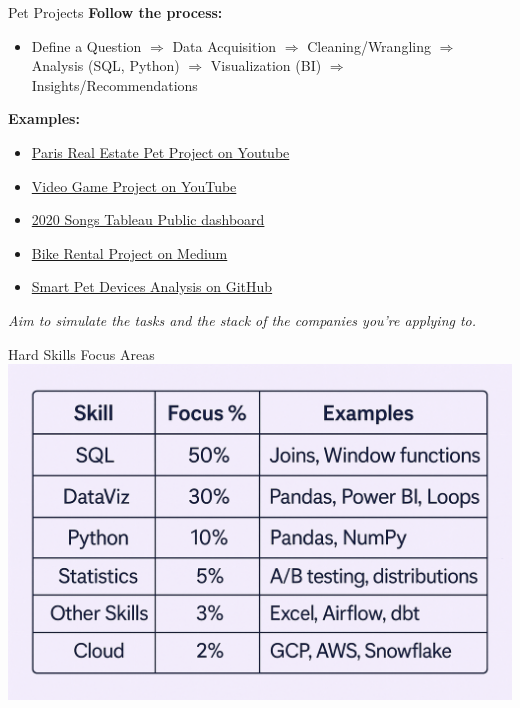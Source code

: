 \documentclass[10pt,a4paper]{article}
\begin{document}
\begin{multicols}{3}
\begin{textbox}{Pet Projects}
\textbf{Follow the process:}
\begin{itemize}
    \item Define a Question $\Rightarrow$ Data Acquisition $\Rightarrow$ Cleaning/Wrangling $\Rightarrow$ Analysis (SQL, Python) $\Rightarrow$ Visualization (BI) $\Rightarrow$ Insights/Recommendations
\end{itemize}
\textbf{Examples:}
\begin{itemize}
    \item \href{https://youtube.com/watch?v=HKuhMtrEgDE}{Paris Real Estate Pet Project on Youtube}
    \item \href{https://youtube.com/watch?v=HKuhMtrEgDE}{Video Game Project on YouTube} 
    \item \href{https://public.tableau.com/app/profile/ryansoares/viz/GoogleSearchTrendsMostSuccessfulSongsof2020/Dashboard}{2020 Songs Tableau Public dashboard} 
    \item \href{https://medium.com/@joseikwame/cyclistic-bike-share-analysis-case-study-99095c444505}{Bike Rental Project on Medium} 
    \item \href{https://github.com/amritachinnam/Customer-Data-Analytics-Power-BI}{Smart Pet Devices Analysis on GitHub}
\end{itemize}

\textit{Aim to simulate the tasks and the stack of the companies you’re applying to.}

\end{textbox}

\begin{textbox}{Hard Skills Focus Areas}
	\includegraphics[width=\textwidth]{table2.png}
\end{textbox}


\end{multicols}
\end{document}
